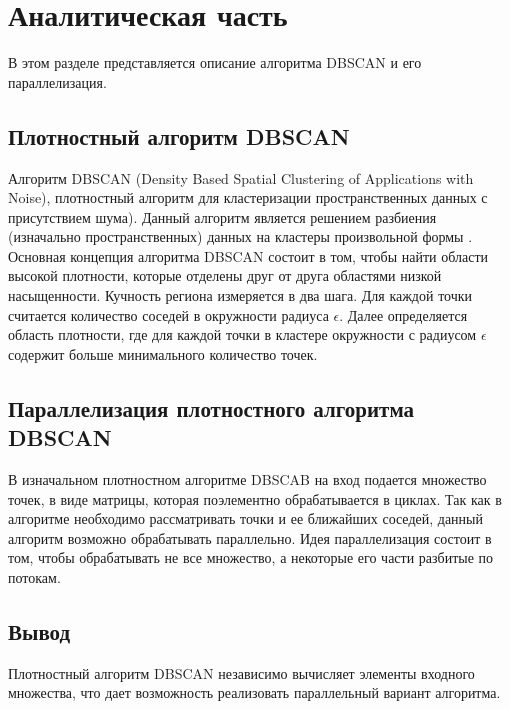 \chapter{Аналитическая часть}

В этом разделе представляется описание алгоритма DBSCAN и его параллелизация.


\section{Плотностный алгоритм DBSCAN}

Алгоритм DBSCAN \cite{dbscan} (Density Based Spatial Clustering of Applications with Noise),
плотностный алгоритм для кластеризации пространственных данных с присутствием
шума). 
Данный алгоритм является решением разбиения (изначально пространственных) данных на кластеры произвольной формы \cite{cluster}.
Основная концепция алгоритма DBSCAN состоит в том, чтобы найти области высокой плотности, которые отделены друг от друга областями низкой насыщенности.
Кучность региона измеряется в два шага. 
Для каждой точки считается количество соседей в окружности радиуса $\epsilon$.
Далее определяется область плотности, где для каждой точки в кластере окружности с радиусом $\epsilon$ содержит больше минимального количество точек.

\section{Параллелизация плотностного алгоритма DBSCAN}

В изначальном плотностном алгоритме DBSCAB на вход подается множество точек, в виде матрицы, которая поэлементно обрабатывается в циклах.
Так как в алгоритме необходимо рассматривать точки и ее ближайших соседей, данный алгоритм возможно обрабатывать параллельно. 
Идея параллелизация состоит в том, чтобы обрабатывать не все множество, а некоторые его части разбитые по потокам.

\section*{Вывод}

Плотностный алгоритм DBSCAN независимо вычисляет элементы входного множества, что дает возможность реализовать параллельный вариант алгоритма.